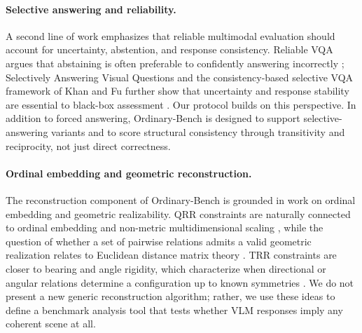 \paragraph{Selective answering and reliability.}
A second line of work emphasizes that reliable multimodal evaluation should account for uncertainty, abstention, and response consistency. Reliable VQA argues that abstaining is often preferable to confidently answering incorrectly \cite{whitehead2022reliablevqa}; Selectively Answering Visual Questions and the consistency-based selective VQA framework of Khan and Fu further show that uncertainty and response stability are essential to black-box assessment \cite{eisenschlos2024selectivevqa,khan2024consistency}. Our protocol builds on this perspective. In addition to forced answering, Ordinary-Bench is designed to support selective-answering variants and to score structural consistency through transitivity and reciprocity, not just direct correctness.

\paragraph{Ordinal embedding and geometric reconstruction.}
The reconstruction component of Ordinary-Bench is grounded in work on ordinal embedding and geometric realizability. QRR constraints are naturally connected to ordinal embedding and non-metric multidimensional scaling \cite{agarwal2007gnmds,ma2018robustordinal}, while the question of whether a set of pairwise relations admits a valid geometric realization relates to Euclidean distance matrix theory \cite{dokmanic2015edm}. TRR constraints are closer to bearing and angle rigidity, which characterize when directional or angular relations determine a configuration up to known symmetries \cite{zhao2019bearingrigidity,chen2021anglerigidity}. We do not present a new generic reconstruction algorithm; rather, we use these ideas to define a benchmark analysis tool that tests whether VLM responses imply any coherent scene at all.
